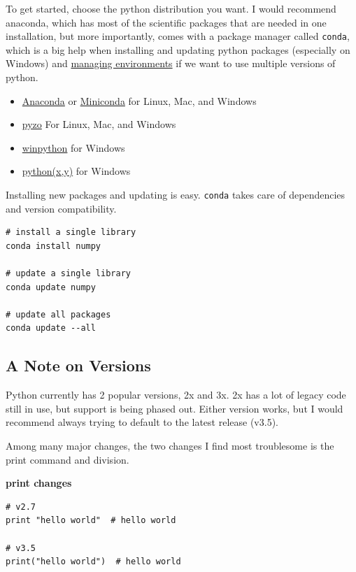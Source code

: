 \documentclass[%
oneside,                 %
final,                   %
10pt]{article}
\begin{document}
To get started, choose the python distribution you want. I would recommend anaconda, which has most of the scientific packages that are needed in one installation, but more importantly, comes with a package manager called \texttt{conda}, which is a big help when installing and updating python packages (especially on Windows) and \href{{http://conda.pydata.org/docs/using/envs.html}}{managing environments} if we want to use multiple versions of python.

\begin{itemize}
\item \href{{https://www.continuum.io/downloads#34}}{Anaconda} or \href{{http://conda.pydata.org/miniconda.html}}{Miniconda} for Linux, Mac, and Windows

\item \href{{http://www.pyzo.org/index.html}}{pyzo} For Linux, Mac, and Windows

\item \href{{http://winpython.sourceforge.net/}}{winpython} for Windows

\item \href{{http://python-xy.github.io/}}{python(x,y)} for Windows
\end{itemize}

\noindent
Installing new packages and updating is easy. \texttt{conda} takes care of dependencies and version compatibility.

\begin{verbatim}
# install a single library
conda install numpy

# update a single library
conda update numpy

# update all packages
conda update --all
\end{verbatim}


\subsection{A Note on Versions}

Python currently has 2 popular versions, 2x and 3x. 2x has a lot of legacy code still in use, but support is being phased out. Either version works, but I would recommend always trying to default to the latest release (v3.5).

Among many major changes, the two changes I find most troublesome is the print command and division.


\textbf{print changes}
\begin{verbatim}
# v2.7
print "hello world"  # hello world

# v3.5
print("hello world")  # hello world
\end{verbatim}
\end{document}
